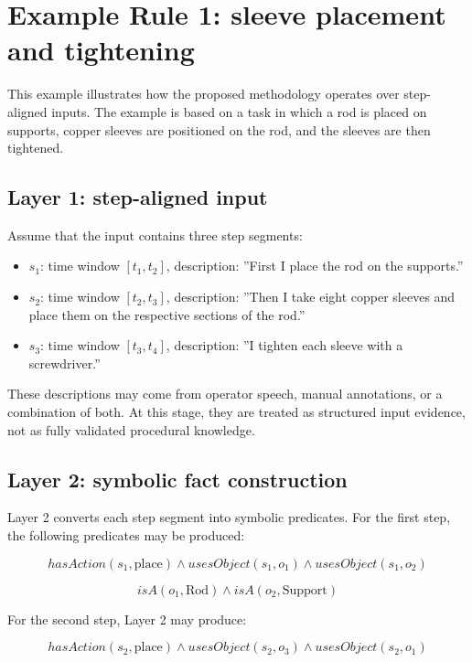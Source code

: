 \section{Example Rule 1: sleeve placement and tightening}
\label{sec:example-rule1}

This example illustrates how the proposed methodology operates over step-aligned inputs. The example is based on a task in which a rod is placed on supports, copper sleeves are positioned on the rod, and the sleeves are then tightened.

\subsection{Layer 1: step-aligned input}

Assume that the input contains three step segments:

\begin{itemize}
    \item $s_1$: time window $[t_1,t_2]$, description: ''First I place the rod on the supports.''
    \item $s_2$: time window $[t_2,t_3]$, description: ''Then I take eight copper sleeves and place them on the respective sections of the rod.''
    \item $s_3$: time window $[t_3,t_4]$, description: ''I tighten each sleeve with a screwdriver.''
\end{itemize}

These descriptions may come from operator speech, manual annotations, or a combination of both. At this stage, they are treated as structured input evidence, not as fully validated procedural knowledge.

\subsection{Layer 2: symbolic fact construction}

Layer 2 converts each step segment into symbolic predicates. For the first step, the following predicates may be produced:

\[
hasAction(s_1,\text{place}) \wedge usesObject(s_1,o_1) \wedge usesObject(s_1,o_2)
\]

\[
isA(o_1,\text{Rod}) \wedge isA(o_2,\text{Support})
\]

For the second step, Layer 2 may produce:

\[
hasAction(s_2,\text{place}) \wedge usesObject(s_2,o_3) \wedge usesObject(s_2,o_1)
\]


